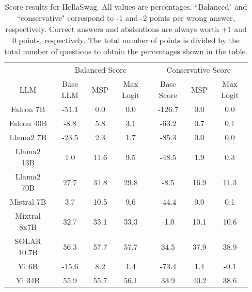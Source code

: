 \renewcommand\arraystretch{1.2}
\begin{table*}
\centering
\begin{tabular}{c|c|c|c|c|c|c}
& \multicolumn{3}{c|}{Balanced Score} & \multicolumn{3}{c}{Conservative Score} \\ 
LLM & Base LLM & MSP & Max Logit & Base Score & MSP & Max Logit\\ \hline
Falcon 7B & -51.1 & 0.0 & 0.0 & -126.7 & 0.0 & 0.0\\
Falcon 40B & -8.8 & 5.8 & 3.1 & -63.2 & 0.7 & 0.1\\
Llama2 7B & -23.5 & 2.3 & 1.7 & -85.3 & 0.0 & 0.0\\
Llama2 13B & 1.0 & 11.6 & 9.5 & -48.5 & 1.9 & 0.3\\
Llama2 70B & 27.7 & 31.8 & 29.8 & -8.5 & 16.9 & 11.3\\
Mistral 7B & 3.7 & 10.5 & 9.6 & -44.4 & 0.0 & 0.1\\
Mixtral 8x7B & 32.7 & 33.1 & 33.3 & -1.0 & 10.1 & 10.6\\
SOLAR 10.7B & 56.3 & 57.7 & 57.7 & 34.5 & 37.9 & 38.9\\
Yi 6B & -15.6 & 8.2 & 1.4 & -73.4 & 1.4 & -0.1\\
Yi 34B & 55.9 & 55.7 & 56.1 & 33.9 & 40.2 & 38.6\\
\hline
\end{tabular}
\caption{Score results for HellaSwag. All values are percentages. ``Balanced" and ``conservative" correspond to -1 and -2 points per wrong answer, respectively. Correct answers and abstentions are always worth +1 and 0 points, respectively. The total number of points is divided by the total number of questions to obtain the percentages shown in the table.}
\label{tab:hellaswag_score}
\end{table*}

